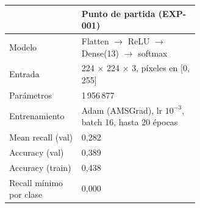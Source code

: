 \begin{tabular}{lp{0.62\linewidth}}
\toprule
 & Punto de partida (EXP-001) \\
\midrule
Modelo & Flatten $\rightarrow$ ReLU $\rightarrow$ Dense(13) $\rightarrow$ softmax \\
Entrada & 224 $\times$ 224 $\times$ 3, píxeles en [0, 255] \\
Parámetros & 1\,956\,877 \\
Entrenamiento & Adam (AMSGrad), lr $10^{-3}$, batch 16, hasta 20 épocas \\
Mean recall (val) & 0,282 \\
Accuracy (val) & 0,389 \\
Accuracy (train) & 0,438 \\
Recall mínimo por clase & 0,000 \\
\bottomrule
\end{tabular}

